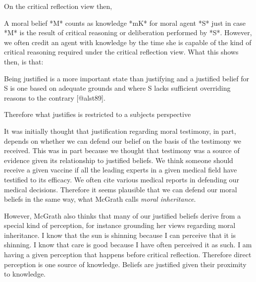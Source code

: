 \documentclass[
  12pt,
]{book}
\newenvironment{Shaded}{\begin{snugshade}}{\end{snugshade}}
\newcommand{\NormalTok}[1]{#1}
\theoremstyle{definition}
\theoremstyle{definition}
\theoremstyle{definition}
\theoremstyle{definition}
\theoremstyle{remark}
\begin{document}
On the critical reflection view then,

\begin{Shaded}
\begin{Highlighting}[]

\NormalTok{A moral belief *M* counts as knowledge *mK* for moral agent *S* just in case *M* is the result of critical reasoning or deliberation performed by *S*. However, we often credit an agent with knowledge by the time she is capable of the kind of critical reasoning required under the critical reflection view. What this shows then, is that:}
\end{Highlighting}
\end{Shaded}

\begin{Shaded}
\begin{Highlighting}[]

\NormalTok{Being justified is a more important state than justifying and a justified belief for S is one based on adequate grounds and where S lacks sufficient overriding reasons to the contrary [@alst89].}
\end{Highlighting}
\end{Shaded}

\begin{Shaded}
\begin{Highlighting}[]

\NormalTok{Therefore what justifies is restricted to a subject\textquotesingle{}s perspective}
\end{Highlighting}
\end{Shaded}

It was initially thought that justification regarding moral testimony, in part, depends on whether we can defend our belief on the basis of the testimony we received. This was in part because we thought that testimony was a source of evidence given its relationship to justified beliefs. We think someone should receive a given vaccine if all the leading experts in a given medical field have testified to its efficacy. We often cite various medical reports in defending our medical decisions. Therefore it seems plausible that we can defend our moral beliefs in the same way, what McGrath calls \emph{moral inheritance}.

However, McGrath also thinks that many of our justified beliefs derive from a special kind of perception, for instance grounding her views regarding moral inheritance. I know that the sun is shinning because I can perceive that it is shinning. I know that care is good because I have often perceived it as such. I am having a given perception that happens before critical reflection. Therefore direct perception is one source of knowledge. Beliefs are justified given their proximity to knowledge.
\end{document}
